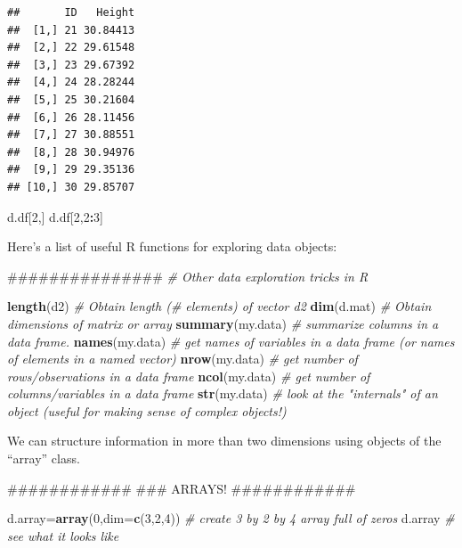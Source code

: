 \documentclass[]{article}
\newenvironment{Shaded}{\begin{snugshade}}{\end{snugshade}}
\newcommand{\KeywordTok}[1]{\textcolor[rgb]{0.13,0.29,0.53}{\textbf{#1}}}
\newcommand{\DataTypeTok}[1]{\textcolor[rgb]{0.13,0.29,0.53}{#1}}
\newcommand{\DecValTok}[1]{\textcolor[rgb]{0.00,0.00,0.81}{#1}}
\newcommand{\CommentTok}[1]{\textcolor[rgb]{0.56,0.35,0.01}{\textit{#1}}}
\newcommand{\OperatorTok}[1]{\textcolor[rgb]{0.81,0.36,0.00}{\textbf{#1}}}
\newcommand{\NormalTok}[1]{#1}
\begin{document}
\begin{verbatim}
##       ID   Height
##  [1,] 21 30.84413
##  [2,] 22 29.61548
##  [3,] 23 29.67392
##  [4,] 24 28.28244
##  [5,] 25 30.21604
##  [6,] 26 28.11456
##  [7,] 27 30.88551
##  [8,] 28 30.94976
##  [9,] 29 29.35136
## [10,] 30 29.85707
\end{verbatim}

\begin{Shaded}
\begin{Highlighting}[]
\NormalTok{d.df[}\DecValTok{2}\NormalTok{,]}
\NormalTok{d.df[}\DecValTok{2}\NormalTok{,}\DecValTok{2}\OperatorTok{:}\DecValTok{3}\NormalTok{]}
\end{Highlighting}
\end{Shaded}

Here's a list of useful R functions for exploring data objects:

\begin{Shaded}
\begin{Highlighting}[]
\NormalTok{###############}
\CommentTok{# Other data exploration tricks in R}

\KeywordTok{length}\NormalTok{(d2)        }\CommentTok{# Obtain length (# elements) of vector d2}
\KeywordTok{dim}\NormalTok{(d.mat)            }\CommentTok{# Obtain dimensions of matrix or array}
\KeywordTok{summary}\NormalTok{(my.data)  }\CommentTok{# summarize columns in a data frame. }
\KeywordTok{names}\NormalTok{(my.data)    }\CommentTok{# get names of variables in a data frame (or names of elements in a named vector)}
\KeywordTok{nrow}\NormalTok{(my.data)     }\CommentTok{# get number of rows/observations in a data frame}
\KeywordTok{ncol}\NormalTok{(my.data)     }\CommentTok{# get number of columns/variables in a data frame}
\KeywordTok{str}\NormalTok{(my.data)      }\CommentTok{# look at the "internals" of an object (useful for making sense of complex objects!)}
\end{Highlighting}
\end{Shaded}

We can structure information in more than two dimensions using objects
of the ``array'' class.

\begin{Shaded}
\begin{Highlighting}[]
\NormalTok{############}
\NormalTok{### ARRAYS!}
\NormalTok{############}

\NormalTok{d.array=}\KeywordTok{array}\NormalTok{(}\DecValTok{0}\NormalTok{,}\DataTypeTok{dim=}\KeywordTok{c}\NormalTok{(}\DecValTok{3}\NormalTok{,}\DecValTok{2}\NormalTok{,}\DecValTok{4}\NormalTok{))       }\CommentTok{# create 3 by 2 by 4 array full of zeros}
\NormalTok{d.array             }\CommentTok{# see what it looks like}
\end{Highlighting}
\end{Shaded}
\end{document}
